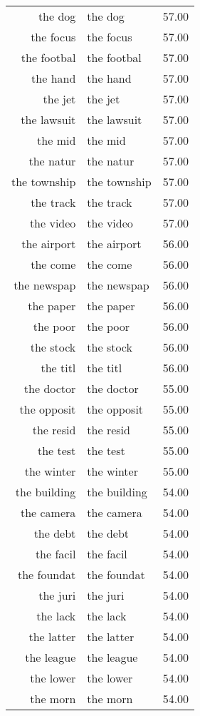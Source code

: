 \begin{table}[ht]
\begin{tabular}{rlr}
  the dog & the dog & 57.00 \\ 
  the focus & the focus & 57.00 \\ 
  the footbal & the footbal & 57.00 \\ 
  the hand & the hand & 57.00 \\ 
  the jet & the jet & 57.00 \\ 
  the lawsuit & the lawsuit & 57.00 \\ 
  the mid & the mid & 57.00 \\ 
  the natur & the natur & 57.00 \\ 
  the township & the township & 57.00 \\ 
  the track & the track & 57.00 \\ 
  the video & the video & 57.00 \\ 
  the airport & the airport & 56.00 \\ 
  the come & the come & 56.00 \\ 
  the newspap & the newspap & 56.00 \\ 
  the paper & the paper & 56.00 \\ 
  the poor & the poor & 56.00 \\ 
  the stock & the stock & 56.00 \\ 
  the titl & the titl & 56.00 \\ 
  the doctor & the doctor & 55.00 \\ 
  the opposit & the opposit & 55.00 \\ 
  the resid & the resid & 55.00 \\ 
  the test & the test & 55.00 \\ 
  the winter & the winter & 55.00 \\ 
  the building & the building & 54.00 \\ 
  the camera & the camera & 54.00 \\ 
  the debt & the debt & 54.00 \\ 
  the facil & the facil & 54.00 \\ 
  the foundat & the foundat & 54.00 \\ 
  the juri & the juri & 54.00 \\ 
  the lack & the lack & 54.00 \\ 
  the latter & the latter & 54.00 \\ 
  the league & the league & 54.00 \\ 
  the lower & the lower & 54.00 \\ 
  the morn & the morn & 54.00 \\ 

\end{tabular}
\end{table}
